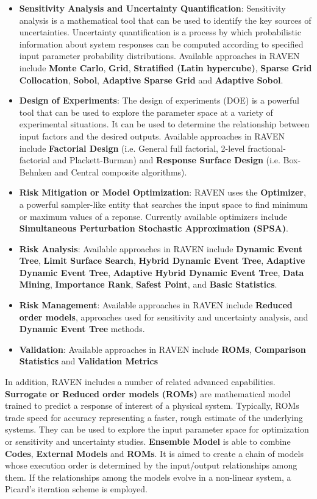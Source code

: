 \begin{itemize}
  \item \textbf{Sensitivity Analysis and Uncertainty Quantification}: Sensitivity analysis is a mathematical tool
    that can be used to identify the key sources of uncertainties. Uncertainty quantification is a process by which
    probabilistic information about system responses can be computed according to specified input parameter probability
    distributions. Available approaches in RAVEN include \textbf{Monte Carlo}, \textbf{Grid}, \textbf{Stratified (Latin hypercube)},
    \textbf{Sparse Grid Collocation}, \textbf{Sobol}, \textbf{Adaptive Sparse Grid} and \textbf{Adaptive Sobol}.
  \item \textbf{Design of Experiments}: The design of experiments (DOE) is a powerful tool that can be used to explore the
    parameter space at a variety of experimental situations. It can be used to determine the relationship between
    input factors and the desired outputs. Available approaches in RAVEN include \textbf{Factorial Design}
    (i.e. General full factorial, 2-level fractional-factorial and Plackett-Burman) and \textbf{Response Surface Design}
    (i.e. Box-Behnken and Central composite algorithms).
  \item \textbf{Risk Mitigation or Model Optimization}: RAVEN uses the \textbf{Optimizer}, a powerful sampler-like entity that searches
    the input space to find minimum or maximum values of a reponse. Currently available optimizers include
    \textbf{Simultaneous Perturbation Stochastic Approximation (SPSA)}.
  \item \textbf{Risk Analysis}: Available approaches in RAVEN include \textbf{Dynamic Event Tree}, \textbf{Limit Surface Search},
    \textbf{Hybrid Dynamic Event Tree}, \textbf{Adaptive Dynamic Event Tree}, \textbf{Adaptive Hybrid Dynamic Event Tree},
    \textbf{Data Mining}, \textbf{Importance Rank}, \textbf{Safest Point}, and \textbf{Basic Statistics}.
  \item \textbf{Risk Management}: Available approaches in RAVEN include \textbf{Reduced order models},
    approaches used for sensitivity and uncertainty analysis, and \textbf{Dynamic Event Tree} methods.
  \item \textbf{Validation}: Available approaches in RAVEN include \textbf{ROMs}, \textbf{Comparison Statistics} and \textbf{Validation Metrics} 
\end{itemize}

In addition, RAVEN includes a number of related advanced capabilities. \textbf{Surrogate or Reduced order models (ROMs)} are mathematical
model trained to predict a response of interest of a physical system. Typically, ROMs trade speed for accuracy representing
a faster, rough estimate of the underlying systems. They can be used to explore the input parameter space for optimization
or sensitivity and uncertainty studies. \textbf{Ensemble Model} is able to combine \textbf{Codes}, \textbf{External Models}
and \textbf{ROMs}. It is aimed to create a chain of models whose execution order is determined by the input/output
relationships among them. If the relationships among the models evolve in a non-linear system, a Picard's iteration scheme is
employed.

